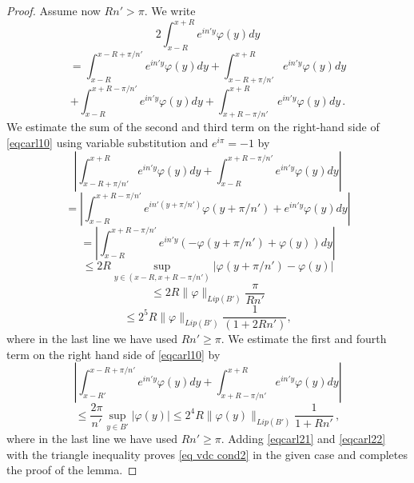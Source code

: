 \begin{proof}
Assume now $Rn'> \pi$.
We write
\begin{equation}\label{eqcarl10}
    2\int_{x-R}^{x+R} e^{in'y}\varphi(y) dy
\end{equation}
\begin{equation*}
=\int_{x-R}^{x-R+\pi/n'} e^{in'y}\varphi(y) dy
+\int_{x-R+\pi/n'}^{x+R} e^{in'y}\varphi(y) dy
\end{equation*}
\begin{equation*}
+\int_{x-R}^{x+R-\pi/n'} e^{in'y}\varphi(y) dy
+\int_{x+R-\pi/n'}^{x+R} e^{in'y}\varphi(y) dy\, .
\end{equation*}
We estimate the sum of the second and third term
on the right-hand side of  \eqref{eqcarl10} using variable substitution and $e^{i\pi}=-1$ by
\begin{equation*}
    \left|\int_{x-R+\pi/n'}^{x+R} e^{in'y}\varphi(y) dy
    +\int_{x-R}^{x+R-\pi/n'} e^{in'y}\varphi(y) dy\right|
\end{equation*}
\begin{equation*}
    =\left|\int_{x-R}^{x+R-\pi/n' }e^{in'(y+\pi/n')}\varphi(y+\pi/n')
    + e^{in'y}\varphi(y) dy\right|
\end{equation*}
\begin{equation*}
    =\left|\int_{x-R}^{x+R-\pi/n' }e^{in'y}(-\varphi(y+\pi/n')
    + \varphi(y)) dy\right|
\end{equation*}
\begin{equation*}
    \le 2R\sup_{y\in (x-R,x+R-\pi/n')}
    |\varphi(y+\pi/n')
    - \varphi(y)|
\end{equation*}
\begin{equation*}
    \le 2R \|\varphi\|_{Lip(B')}\frac{\pi}{Rn'}
\end{equation*}
\begin{equation}\label{eqcarl21}
    \le 2^5 R \|\varphi\|_{Lip(B')}\frac{1}{(1+2Rn')},
\end{equation}
where in the last line we have used $Rn'\ge \pi$.
We estimate the first and fourth term on the right hand side of \eqref{eqcarl10} by
\begin{equation*}
    \left|\int_{x-R'}^{x-R+\pi/n'} e^{in'y}\varphi(y) dy
    +\int_{x+R-\pi/n'}^{x+R} e^{in'y}\varphi(y) dy\right|
\end{equation*}
\begin{equation}\label{eqcarl22}
    \le \frac{2\pi}{n'}\sup_{y\in B'}|\varphi(y)|
        \le 2^4 R\|\varphi(y)\|_{Lip(B')}\frac 1 {1+Rn'}\, ,
\end{equation}
where in the last line we have used $Rn'\ge \pi$.
Adding \eqref{eqcarl21} and \eqref{eqcarl22}
with the triangle inequality proves \eqref{eq vdc cond2} in the given case and completes the proof of the lemma.
\end{proof}

